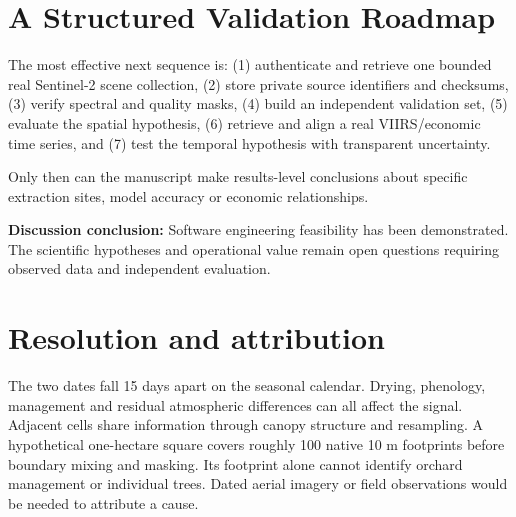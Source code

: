 \section{A Structured Validation Roadmap}

The most effective next sequence is: (1) authenticate and retrieve one bounded real Sentinel-2 scene collection, (2) store private source identifiers and checksums, (3) verify spectral and quality masks, (4) build an independent validation set, (5) evaluate the spatial hypothesis, (6) retrieve and align a real VIIRS/economic time series, and (7) test the temporal hypothesis with transparent uncertainty.

Only then can the manuscript make results-level conclusions about specific extraction sites, model accuracy or economic relationships.

\textbf{Discussion conclusion:} Software engineering feasibility has been demonstrated. The scientific hypotheses and operational value remain open questions requiring observed data and independent evaluation.

\section{Resolution and attribution}
The two dates fall 15 days apart on the seasonal calendar. Drying, phenology, management and residual atmospheric differences can all affect the signal. Adjacent cells share information through canopy structure and resampling. A hypothetical one-hectare square covers roughly 100 native 10 m footprints before boundary mixing and masking. Its footprint alone cannot identify orchard management or individual trees. Dated aerial imagery or field observations would be needed to attribute a cause.
